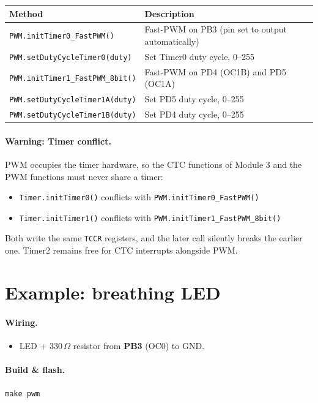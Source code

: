 \documentclass[11pt,a4paper]{article}
\begin{document}
\begin{center}
\small
\begin{tabular}{ll}
\toprule
\textbf{Method} & \textbf{Description} \\
\midrule
\texttt{PWM.initTimer0\_FastPWM()} & Fast-PWM on PB3 (pin set to output automatically) \\
\texttt{PWM.setDutyCycleTimer0(duty)} & Set Timer0 duty cycle, 0--255 \\
\texttt{PWM.initTimer1\_FastPWM\_8bit()} & Fast-PWM on PD4 (OC1B) and PD5 (OC1A) \\
\texttt{PWM.setDutyCycleTimer1A(duty)} & Set PD5 duty cycle, 0--255 \\
\texttt{PWM.setDutyCycleTimer1B(duty)} & Set PD4 duty cycle, 0--255 \\
\bottomrule
\end{tabular}
\end{center}

\paragraph{Warning: Timer conflict.} PWM occupies the timer hardware, so the
CTC functions of Module 3 and the PWM functions must never share a timer:
\begin{itemize}
  \item \texttt{Timer.initTimer0()} conflicts with \texttt{PWM.initTimer0\_FastPWM()}
  \item \texttt{Timer.initTimer1()} conflicts with \texttt{PWM.initTimer1\_FastPWM\_8bit()}
\end{itemize}
Both write the same \texttt{TCCR} registers, and the later call silently
breaks the earlier one. Timer2 remains free for CTC interrupts alongside PWM.

\section{Example: breathing LED}

\paragraph{Wiring.}
\begin{itemize}
  \item LED + 330\,$\Omega$ resistor from \textbf{PB3} (OC0) to GND.
\end{itemize}

\paragraph{Build \& flash.} \texttt{make pwm}
\end{document}
